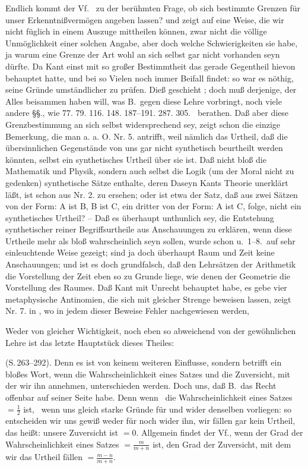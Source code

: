 Endlich kommt der Vf.\  zu der berühmten Frage, ob sich bestimmte Grenzen für unser Erkenntnißvermögen angeben lassen? und zeigt auf eine Weise, die wir nicht füglich in einem Auszuge mittheilen können, zwar nicht die völlige Unmöglichkeit einer solchen Angabe, aber doch welche Schwierigkeiten sie habe, ja warum eine Grenze der Art wohl an sich selbst gar nicht vorhanden seyn dürfte. Da Kant einst mit so großer Bestimmtheit das gerade Gegentheil hievon behauptet hatte, und bei so Vielen noch immer Beifall findet: so war es nöthig, seine Gründe umständlicher zu prüfen. Dieß geschieht ; doch muß derjenige, der Alles beisammen haben will, was B.\ gegen diese Lehre vorbringt, noch viele andere §§., wie 77. 79. 116. 148. 187--191. 287. 305. \ua\  berathen. Daß aber diese Grenzbestimmung an sich selbst widersprechend sey, zeigt schon die einzige Bemerkung, die man a. a. O. Nr. 5. antrifft, weil nämlich das Urtheil, daß die übersinnlichen Gegenstände von uns gar nicht synthetisch beurtheilt werden könnten, selbst  ein synthetisches Urtheil über sie ist. Daß nicht bloß die Mathematik und Physik, sondern auch selbst die Logik (um der Moral nicht zu gedenken) synthetische Sätze enthalte, deren Daseyn Kants Theorie unerklärt läßt, ist schon aus Nr. 2. zu ersehen; oder ist etwa der Satz, daß aus zwei Sätzen von der Form: A ist B, B ist C, ein dritter von der Form: A ist C, folge, nicht ein synthetisches Urtheil? -- Daß es überhaupt unthunlich sey, die Entstehung synthetischer reiner Begriffsurtheile aus Anschauungen zu erklären, wenn diese Urtheile mehr als bloß wahrscheinlich seyn sollen, wurde schon  u.~1--8.\ auf sehr einleuchtende Weise gezeigt; sind ja doch überhaupt Raum und Zeit keine Anschauungen; und ist es doch grundfalsch, daß den Lehrsätzen der Arithmetik die Vorstellung der Zeit eben so zu Grunde liege, wie denen der Geometrie die Vorstellung des Raumes. Daß Kant mit Unrecht behauptet habe, es gebe vier metaphysische Antinomien, die sich mit gleicher Strenge beweisen lassen, zeigt Nr. 7. in , wo in jedem dieser Beweise Fehler nachgewiesen werden, \umA\  \par 
Weder von gleicher Wichtigkeit, noch eben so abweichend von der gewöhnlichen Lehre ist das letzte Hauptstück dieses Theiles:  \par 
(S.\,263--292). Denn es ist von keinem weiteren Einflusse, sondern betrifft ein bloßes Wort, wenn die Wahrscheinlichkeit eines Satzes und die Zuversicht, mit der wir ihn annehmen, unterschieden werden. Doch  uns, daß B.\ das Recht offenbar auf seiner Seite habe. Denn wenn \zB\ die Wahrscheinlichkeit eines Satzes $= \frac{1}{2}$ ist, \dh\  wenn uns gleich starke Gründe für und wider denselben vorliegen: so entscheiden wir uns gewiß weder für noch wider ihn, wir fällen gar kein Urtheil, das heißt: unsere Zuversicht ist $= 0$. Allgemein findet der Vf., wenn der Grad der Wahrscheinlichkeit eines Satzes $= \frac{m}{m+n}$ ist, den Grad der Zuversicht, mit dem wir das Urtheil fällen $= \frac{m-n}{m+n}$. \par
